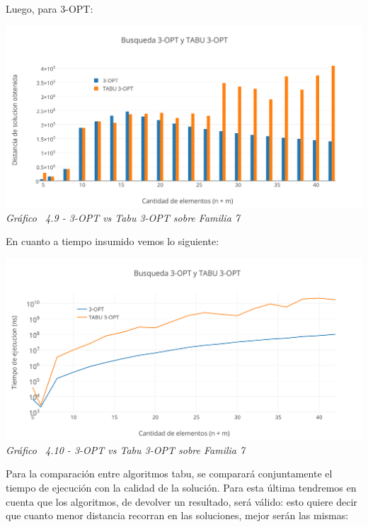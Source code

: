 Luego, para 3-OPT:

\vspace*{0.3cm} \vspace*{0.3cm}
  \begin{center}
 \includegraphics[scale=0.5]{./EJ4/comparativoanillos3opt.png}\\
 {            \textit{Gráfico \ 4.9 - 3-OPT vs Tabu 3-OPT sobre Familia 7}}
  \end{center}
  \vspace*{0.3cm}

En cuanto a tiempo insumido vemos lo siguiente:

\vspace*{0.3cm} \vspace*{0.3cm}
  \begin{center}
 \includegraphics[scale=0.5]{./EJ4/medicionanillos3opt.png}\\
 {            \textit{Gráfico \ 4.10 - 3-OPT vs Tabu 3-OPT sobre Familia 7}}
  \end{center}
  \vspace*{0.3cm}
  
Para la comparación entre algoritmos tabu, se comparará conjuntamente el tiempo de ejecución con la calidad de la solución. Para esta última tendremos en cuenta que los algoritmos, de devolver un resultado, será válido: esto quiere decir que cuanto menor distancia recorran en las soluciones, mejor serán las mismas:

